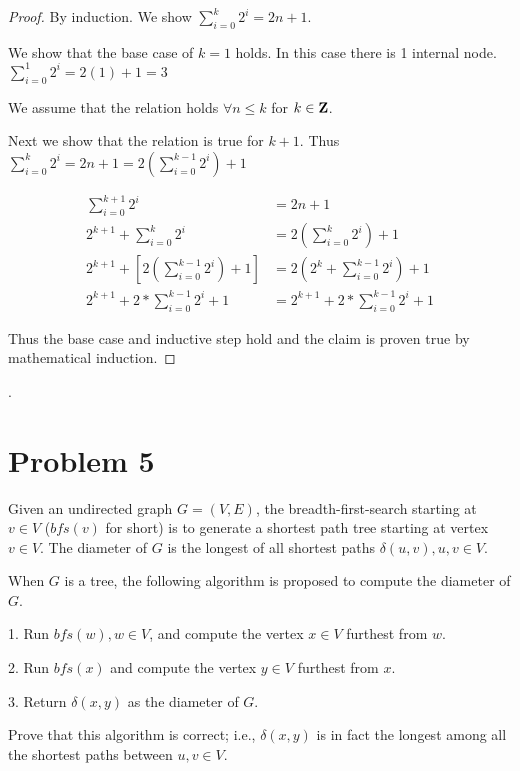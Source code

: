 \documentclass[11pt]{article}
\begin{document}
\begin{proof}
By induction. We show $\sum _{i = 0}^{k} 2^i = 2n + 1$.

We show that the base case of $k = 1$ holds. In this case there is 1 internal node. $\sum _{i = 0}^{1} 2^i = 2(1) + 1 = 3$

We assume that the relation holds $\forall n \leq k$ for $k \in \mathbf{Z}$.

Next we show that the relation is true for $k + 1$. Thus $\sum _{i = 0}^{k} 2^i = 2n + 1 = 2 \left( \sum _{i = 0}^{k-1} 2^i \right) + 1$

\begin{equation}
\begin{split}
\sum _{i = 0}^{k + 1} 2^i &= 2n + 1\\
2 ^{k+1} + \sum _{i = 0}^{k} 2^i &= 2 (\sum _{i = 0}^{k} 2^i) + 1\\
2 ^{k+1} + \left [2 \left( \sum _{i = 0}^{k-1} 2^i \right) + 1 \right ] &= 2 \left( 2^k + \sum _{i = 0}^{k-1} 2^i \right) + 1\\
2 ^{k+1} + 2 * \sum _{i = 0}^{k-1} 2^i + 1 &= 2^{k + 1} + 2 * \sum _{i = 0}^{k-1} 2^i + 1
\end{split}
\end{equation} 

Thus the base case and inductive step hold and the claim is proven true by mathematical induction.
\end{proof}

\newpage.
\section*{Problem 5}

Given an undirected graph $G=(V,E)$, the breadth-first-search starting at $v\in V$
($bfs(v)$ for short) is to generate a shortest path tree starting at vertex
$v\in V$. The diameter of $G$ is the longest of all shortest paths $\delta(u,v), u,v\in V$.
\newline

When $G$ is a tree, the following algorithm is proposed to compute the
diameter of $G$.
\newline

1. Run $bfs(w), w\in V$, and compute the vertex $x\in V$ furthest from $w$.

2. Run $bfs(x)$ and compute the vertex $y\in V$ furthest from $x$.

3. Return $\delta(x,y)$ as the diameter of $G$.
\newline

Prove that this algorithm is correct; i.e., $\delta(x,y)$ is in fact the
longest among all the shortest paths between $u,v\in V$.
\newline

\end{document}
